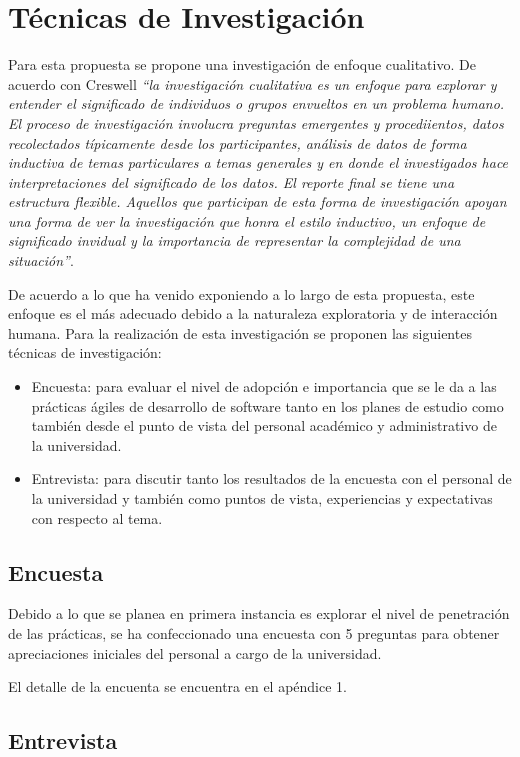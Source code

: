 \section{Técnicas de Investigación}
Para esta propuesta se propone una investigación de enfoque cualitativo. De acuerdo con  Creswell \cite{creswell} \emph{``la investigación cualitativa es un enfoque para explorar y entender el significado de individuos o grupos envueltos en un problema humano. El proceso de investigación involucra preguntas emergentes y procediientos, datos recolectados típicamente desde los participantes, análisis de datos de forma inductiva de temas particulares a temas generales y en donde el investigados hace interpretaciones del significado de los datos. El reporte final se tiene una estructura flexible. Aquellos que participan de esta forma de investigación apoyan una forma de ver la investigación que honra el estilo inductivo, un enfoque de significado invidual y la importancia de representar la complejidad de una situación''}.

De acuerdo a lo que ha venido exponiendo a lo largo de esta propuesta, este enfoque es el más adecuado debido a la naturaleza exploratoria y de interacción humana. Para la realización de esta investigación se proponen las siguientes técnicas de investigación:
\begin{itemize}
    \item Encuesta: para evaluar el nivel de adopción e importancia que se le da a las prácticas ágiles de desarrollo de software tanto en los planes de estudio como también desde el punto de vista del personal académico y administrativo de la universidad. 
    \item Entrevista: para discutir tanto los resultados de la encuesta con el personal de la universidad y también como puntos de vista, experiencias y expectativas con respecto al tema.   
\end{itemize}
 
\subsection{Encuesta}
Debido a lo que se planea en primera instancia es explorar el nivel de penetración de las prácticas, se ha confeccionado una encuesta con 5 preguntas para obtener apreciaciones iniciales del personal a cargo de la universidad.

El detalle de la encuenta se encuentra en el apéndice 1.


\subsection{Entrevista}

